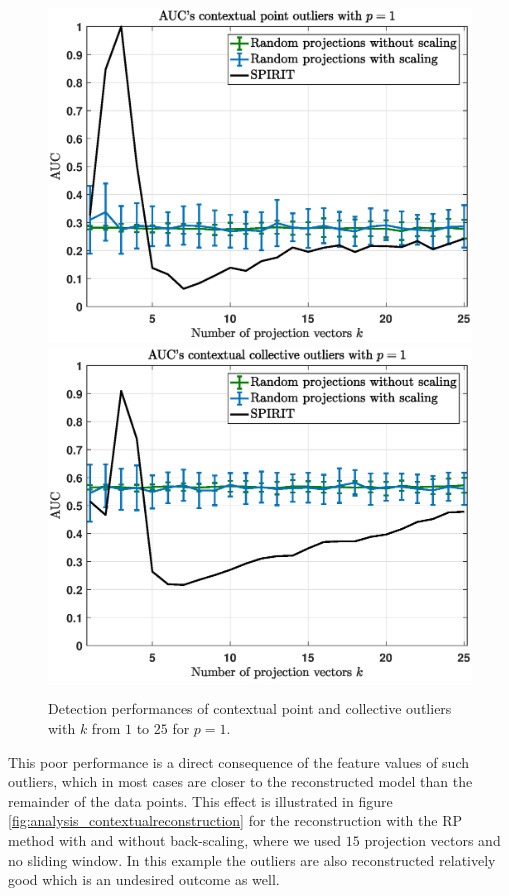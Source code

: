 \begin{figure}[h]
	\centering
	\vspace{0.25cm}
	\includegraphics[scale=0.36]{analysis/AUCs_contextual}
	\includegraphics[scale=0.36]{analysis/AUCs_collective}
	\vspace{0.1cm}
	\caption{Detection performances of contextual point and collective outliers with $k$ from $1$ to $25$ for $p=1$.}
	\label{fig:analysis_aucs_contextual}
	\vspace{0.25cm}
\end{figure}

This poor performance is a direct consequence of the feature values of such outliers, which in most cases are closer to the reconstructed model than the remainder of the data points. This effect is illustrated in figure \ref{fig:analysis_contextualreconstruction} for the reconstruction with the RP method with and without back-scaling, where we used $15$ projection vectors and no sliding window. In this example the outliers are also reconstructed relatively good which is an undesired outcome as well.

